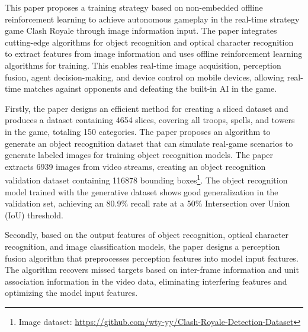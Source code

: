 \clearpage
{}

\titlespacing{\chapter}{0pt}{0mm}{5mm}

\noindent This paper proposes a training strategy based on non-embedded offline reinforcement learning to achieve autonomous gameplay in the real-time strategy game Clash Royale through image information input. The paper integrates cutting-edge algorithms for object recognition and optical character recognition to extract features from image information and uses offline reinforcement learning algorithms for training. This enables real-time image acquisition, perception fusion, agent decision-making, and device control on mobile devices, allowing real-time matches against opponents and defeating the built-in AI in the game.

\noindent Firstly, the paper designs an efficient method for creating a sliced dataset and produces a dataset containing 4654 slices, covering all troops, spells, and towers in the game, totaling 150 categories. The paper proposes an algorithm to generate an object recognition dataset that can simulate real-game scenarios to
generate labeled images for training object recognition models. The paper extracts 6939 images from video streams, creating an object recognition validation dataset containing 116878 bounding boxes\footnote{Image dataset: \url{https://github.com/wty-yy/Clash-Royale-Detection-Dataset}\hfill}. The object recognition model trained with the generative dataset shows good generalization in the validation set, achieving an 80.9\% recall rate at a 50\% Intersection over Union (IoU) threshold.

\noindent Secondly, based on the output features of object recognition, optical character recognition, and image classification models, the paper designs a perception fusion algorithm that preprocesses perception features into model input features. The algorithm recovers missed targets based on inter-frame information and unit association information in the video data, eliminating interfering features and optimizing the model input features.

